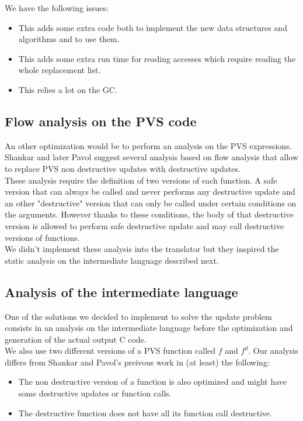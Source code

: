 \documentclass[12pt,a4paper]{article}
\begin{document}
We have the following issues:
\begin{itemize}
\item This adds some extra code both to implement the new data structures and algorithms and to use them.
\item This adds some extra run time for reading accesses which require reading the whole replacement list.
\item This relies a lot on the GC.
\end{itemize}


\subsection{Flow analysis on the PVS code}

An other optimization would be to perform an analysis on the PVS expressions. Shankar \cite{shankar02} and later Pavol \cite{pavol} suggest several analysis based on flow analysis that allow to replace PVS non destructive updates with destructive updates.\\

These analysis require the definition of two versions of each function. A safe version that can always be called and never  performs any destructive update and an other "destructive" version that can only be called under certain conditions on the arguments. However thanks to these conditions, the body of that destructive version is allowed to perform safe destructive update and may call destructive versions of functions.\\

We didn't implement these analysis into the translator but they inspired the static analysis on the intermediate language described next.


\subsection{Analysis of the intermediate language}
\label{Canalysis}

One of the solutions we decided to implement to solve the update problem  consists in an analysis on the intermediate language before the optimization and generation of the actual output C code.\\

We also use two different versions of a PVS function called $f$ and $f^d$. Our analysis differs from Shankar and Pavol's preivous work in (at least) the following:
\begin{itemize}
\item The non destructive version of a function is also optimized and might have some destructive updates or function calls.
\item The destructive function does not have all its function call destructive.
\end{itemize}
\end{document}
